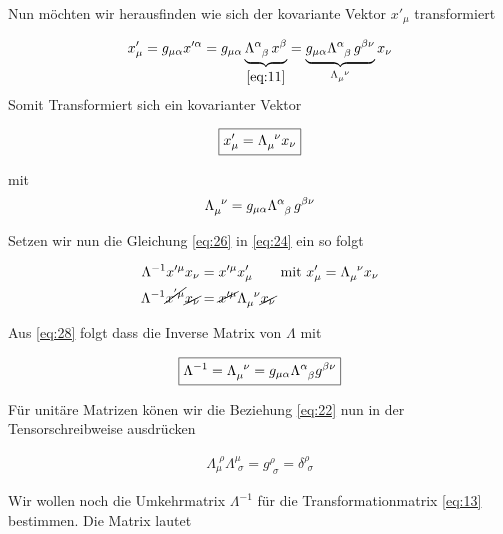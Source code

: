 Nun möchten wir herausfinden wie sich der kovariante Vektor \(x'_{\mu}\) transformiert

\begin{align}
  \label{eq:25}
  x'_{\mu} = g_{\mu\alpha} x'^\alpha 
  = g_{\mu\alpha}\underbrace{ \Lambda^{\alpha}_{\hphantom\alpha \beta}
    \,x^\beta}_{\eqref{eq:11}} 
  =\underbrace{ g_{\mu\alpha}\Lambda^{\alpha}_{\hphantom\alpha\beta}\,
    g^{\beta\nu}}_{\Lambda^{\hphantom \mu \nu}_{\mu}}x_{\nu}
\end{align}
Somit Transformiert sich ein kovarianter Vektor

\begin{align}
  \label{eq:26}
   \boxed{x'_{\mu} = \Lambda^{\hphantom \mu \nu}_{\mu}x_{\nu}}
\end{align}

mit 
\begin{align}
  \label{eq:27}
  \Lambda^{\hphantom \mu \nu}_{\mu} 
  = g_{\mu\alpha}\Lambda^{\alpha}_{\hphantom\alpha \beta}\,g^{\beta\nu}
\end{align}

Setzen wir nun die Gleichung \eqref{eq:26} in \eqref{eq:24} ein so folgt

\begin{align}
  \label{eq:28}
  \Lambda^{-1}x'^{\mu} x_\nu &= x'^{\mu}x'_{\mu} 
  \qquad\text{mit } x'_{\mu} = \Lambda^{\hphantom \mu \nu}_{\mu}x_{\nu} \notag \\
 \Lambda^{-1}\cancel{x^{'\mu}}\cancel{ x_\nu} &= \cancel{x'^{\mu}}\Lambda^{\hphantom \mu \nu}_{\mu}\cancel{x_{\nu}} \notag \\
\end{align}

Aus \eqref{eq:28} folgt dass die Inverse Matrix von \(\Lambda\) mit

\begin{align}
  \label{eq:29}
   \boxed{ \Lambda^{-1} = \Lambda^{\hphantom \mu \nu}_{\mu} = g_{\mu\alpha}\Lambda^{\alpha}_{\hphantom\alpha \beta}g^{\beta\nu} }
\end{align}


Für unitäre Matrizen könen wir die Beziehung  \eqref{eq:22} nun in der Tensorschreibweise ausdrücken

\begin{align}
  \label{eq:17}
 \boxed{ \Lambda_\mu^{\,\, \rho}\Lambda^\mu_{\,\,\sigma} = g^\rho_{\,\,\sigma} =
   \delta^\rho_{\,\, \sigma} }
\end{align}

Wir wollen noch die Umkehrmatrix \(\Lambda^{-1}\) für die Transformationmatrix
\eqref{eq:13} bestimmen. Die Matrix lautet

